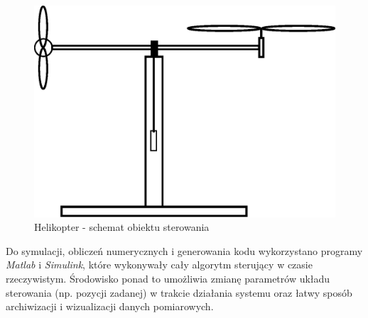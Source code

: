 \documentclass[11pt,a4paper]{article}
\begin{document}
\begin{figure}[h!]
	\centering
	\includegraphics[scale = 0.4]{Figures/model_helikoptera.eps}
	\caption		
	{Helikopter - schemat obiektu sterowania}
	\label{heli_model}
\end{figure} 
Do symulacji, obliczeń numerycznych i generowania kodu wykorzystano programy \textit{Matlab} i \textit{Simulink}, które wykonywały cały algorytm sterujący w czasie rzeczywistym. \'Srodowisko ponad to umożliwia zmianę parametrów układu sterowania (np. pozycji zadanej) w trakcie działania systemu oraz łatwy sposób archiwizacji i wizualizacji danych pomiarowych.

\FloatBarrier
\end{document}
